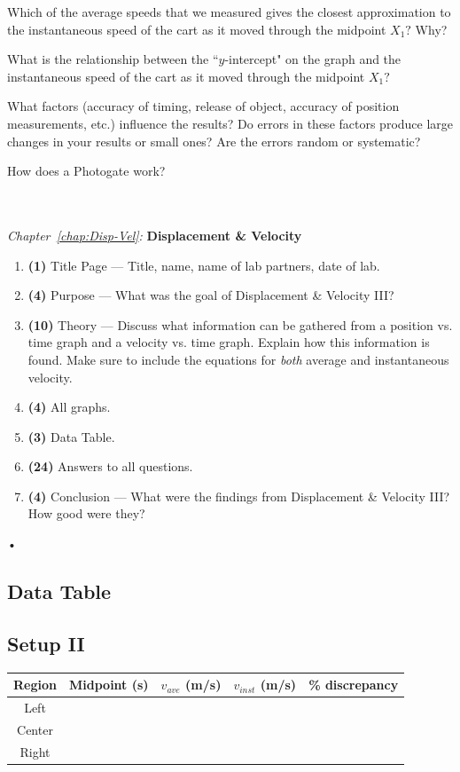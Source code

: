 \documentclass[main.tex]{subfiles}
\begin{document}
\begin{question}
Which of the average speeds that we measured gives the closest approximation to the instantaneous speed of the cart as it moved through the midpoint $X_1?$ Why?
\end{question}
\begin{question}
What is the relationship between the ``$y$-intercept" on the graph and the instantaneous speed of the cart as it moved through the midpoint $X_1?$
\end{question}
\begin{question}
What factors (accuracy of timing, release of object, accuracy of position measurements, etc.) influence the results? Do errors in these factors produce large changes in your results or small ones? Are the errors random or systematic?
\end{question}
\begin{question}
How does a Photogate work?
\end{question}

\begin{samepage}
\hrulefill\\ \\
\emph{Chapter~\ref{chap:Disp-Vel}:} \textbf{Displacement \& Velocity}
\begin{enumerate}
\item
\textbf{(1)} Title Page --- Title, name, name of lab partners, date of lab.
\item
\textbf{(4)} Purpose --- What was the goal of Displacement \& Velocity III?
\item
\textbf{(10)} Theory --- Discuss what information can be gathered from a position vs. time graph and a velocity vs. time graph. Explain how this information is found. Make sure to include the equations for \emph{both} average and instantaneous velocity.
\item
\textbf{(4)} All graphs.
\item
\textbf{(3)} Data Table.
\item
\textbf{(24)} Answers to all questions.
\item
\textbf{(4)} Conclusion --- What were the findings from Displacement \& Velocity III? How good were they?
\end{enumerate}•
\end{samepage}

\newpage
\begin{doublespace}
\section{Data Table}
\subsection*{Setup II}

\begin{tabular}{|c|c|c|c|c|}
\hline
Region & Midpoint (s) & $v_{ave}$ (m/s) & $v_{inst}$ (m/s) & \% discrepancy\\
\hline
Left &&&&\\
\hline
Center &&&&\\
\hline
Right &&&&\\
\hline
\end{tabular}

\end{doublespace}
\end{document}
